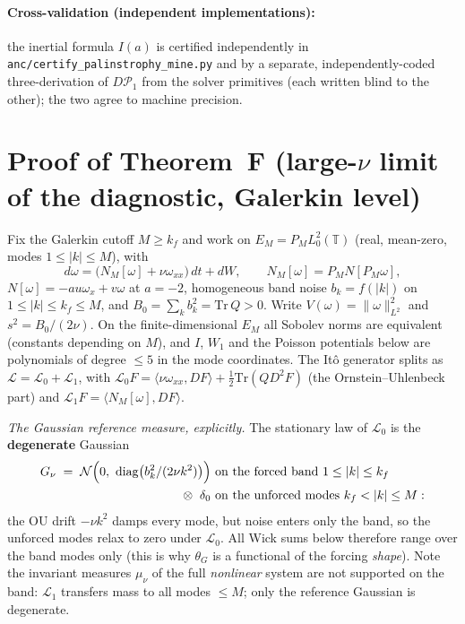 \documentclass[11pt]{article}
\theoremstyle{remark}
\theoremstyle{plain}
\begin{document}
\paragraph{Cross-validation (independent implementations):} the inertial formula
$I(a)$ is certified
independently in \texttt{anc/certify\_palinstrophy\_mine.py} and by a separate,
independently-coded three-derivation of $D\mathcal{P}_1$ from the solver primitives
(each written blind to the other); the
two agree to machine precision.



\section{Proof of Theorem~F (large-$\nu$ limit of the diagnostic, Galerkin level)}
\label{app:thmF}

Fix the Galerkin cutoff $M \ge k_f$ and work on $E_M = P_M L^2_0(\mathbb{T})$ (real, mean-zero, modes
$1 \le |k| \le M$), with
\begin{equation}
  d\omega = \bigl(N_M[\omega] + \nu\omega_{xx}\bigr)\,dt + dW, \qquad N_M[\omega] = P_M N[P_M\omega],
\end{equation}
$N[\omega] = -au\omega_x + v\omega$ at $a=-2$, homogeneous band noise $b_k = f(|k|)$ on
$1 \le |k| \le k_f \le M$, and $B_0 = \sum_k b_k^2 = \mathrm{Tr}\,Q > 0$. Write $V(\omega) = \|\omega\|_{L^2}^2$
and $s^2 = B_0/(2\nu)$. On the finite-dimensional $E_M$ all Sobolev norms are equivalent (constants
depending on $M$), and $I$, $W_1$ and the Poisson potentials below are polynomials of degree $\le 5$
in the mode coordinates. The It\^o generator splits as $\mathcal{L} = \mathcal{L}_0 + \mathcal{L}_1$,
with $\mathcal{L}_0 F = \langle\nu\omega_{xx},DF\rangle + \tfrac12\mathrm{Tr}(QD^2F)$ (the
Ornstein--Uhlenbeck part) and
$\mathcal{L}_1 F = \langle N_M[\omega],DF\rangle$.

\emph{The Gaussian reference measure, explicitly.} The stationary law of $\mathcal{L}_0$ is the
\textbf{degenerate} Gaussian
\begin{equation}
\begin{aligned}
  G_\nu \;=\; \mathcal{N}\Bigl(0,\ \mathrm{diag}\bigl(b_k^2/(2\nu k^2)\bigr)\Bigr)
  \ &\text{on the forced band } 1 \le |k| \le k_f \\
  {}\otimes\ \delta_0 \ &\text{on the unforced modes } k_f < |k| \le M:
\end{aligned}
\end{equation}
the OU drift $-\nu k^2$ damps every mode, but noise enters only the band, so the unforced
modes relax to zero under $\mathcal{L}_0$. All Wick sums below therefore range over the
band modes only (this is why $\theta_G$ is a functional of the forcing \emph{shape}). Note
the invariant measures $\mu_\nu$ of the full \emph{nonlinear} system are not supported on
the band: $\mathcal{L}_1$ transfers mass to all modes $\le M$; only the reference Gaussian
is degenerate.
\end{document}
